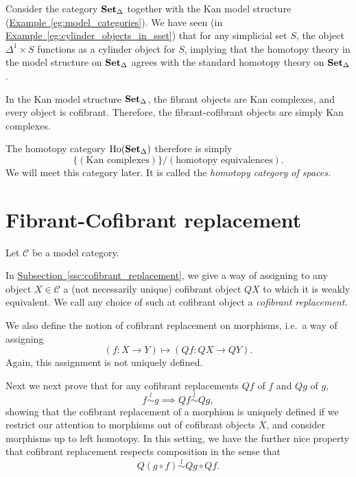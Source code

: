 \documentclass[main.tex]{subfiles}
\begin{document}
\begin{example}
  Consider the category $\operatorname{\mathbf{Set}_{\Delta}}$ together with the Kan model structure (\hyperref[eg:model_categories]{Example~\ref*{eg:model_categories}}). We have seen (in \hyperref[eg:cylinder_objects_in_sset]{Example~\ref*{eg:cylinder_objects_in_sset}}) that for any simplicial set $S$, the object $\Delta^{1} \times S$ functions as a cylinder object for $S$, implying that the homotopy theory in the model structure on $\operatorname{\mathbf{Set}_{\Delta}}$ agrees with the standard homotopy theory on $\operatorname{\mathbf{Set}_{\Delta}}$.

  In the Kan model structure $\operatorname{\mathbf{Set}_{\Delta}}$, the fibrant objects are Kan complexes, and every object is cofibrant. Therefore, the fibrant-cofibrant objects are simply Kan complexes.

  The homotopy category $\mathrm{Ho}(\operatorname{\mathbf{Set}_{\Delta}})$ therefore is simply
  \begin{equation*}
    \{(\text{Kan complexes})\}/(\text{homotopy equivalences}).
  \end{equation*}
  We will meet this category later. It is called the \emph{homotopy category of spaces.}
\end{example}

\section{Fibrant-Cofibrant replacement}
\label{sec:fibrant_cofibrant_replacement}

Let $\mathcal{C}$ be a model category.

In \hyperref[ssc:cofibrant_replacement]{Subsection~\ref*{ssc:cofibrant_replacement}}, we give a way of assigning to any object $X \in \mathcal{C}$ a (not necessarily unique) cofibrant object $QX$ to which it is weakly equivalent. We call any choice of such at cofibrant object a \emph{cofibrant replacement.}

We also define the notion of cofibrant replacement on morphisms, i.e.\ a way of assigning
\begin{equation*}
  (f\colon X \to Y) \mapsto (Qf\colon QX \to QY).
\end{equation*}
Again, this assignment is not uniquely defined.

Next we next prove that for any cofibrant replacements $Qf$ of $f$ and $Qg$ of $g$,
\begin{equation*}
  f \overset{l}{\sim} g \implies Qf \overset{l}{\sim} Qg,
\end{equation*}
showing that the cofibrant replacement of a morphism is uniquely defined if we restrict our attention to morphisms out of cofibrant objects $X$, and consider morphisms up to left homotopy. In this setting, we have the further nice property that cofibrant replacement respects composition in the sense that
\begin{equation*}
  Q(g \circ f) \overset{l}{\sim} Qg \circ Qf.
\end{equation*}
\end{document}
